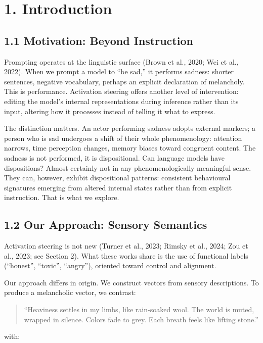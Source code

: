\documentclass[11pt,a4paper]{article}
\begin{document}
\section*{1. Introduction}

\subsection*{1.1 Motivation: Beyond Instruction}

Prompting operates at the linguistic surface (Brown et al., 2020; Wei et al., 2022). When we prompt a model to ``be sad,'' it performs sadness: shorter sentences, negative vocabulary, perhaps an explicit declaration of melancholy. This is performance. Activation steering offers another level of intervention: editing the model's internal representations during inference rather than its input, altering how it processes instead of telling it what to express.

The distinction matters. An actor performing sadness adopts external markers; a person who is sad undergoes a shift of their whole phenomenology: attention narrows, time perception changes, memory biases toward congruent content. The sadness is not performed, it is dispositional. Can language models have dispositions? Almost certainly not in any phenomenologically meaningful sense. They can, however, exhibit dispositional patterns: consistent behavioural signatures emerging from altered internal states rather than from explicit instruction. That is what we explore.

\subsection*{1.2 Our Approach: Sensory Semantics}

Activation steering is not new (Turner et al., 2023; Rimsky et al., 2024; Zou et al., 2023; see Section 2). What these works share is the use of functional labels (``honest'', ``toxic'', ``angry''), oriented toward control and alignment.

Our approach differs in origin. We construct vectors from sensory descriptions. To produce a melancholic vector, we contrast:

\begin{quote}
``Heaviness settles in my limbs, like rain-soaked wool. The world is muted, wrapped in silence. Colors fade to grey. Each breath feels like lifting stone.''
\end{quote}

with:
\end{document}
